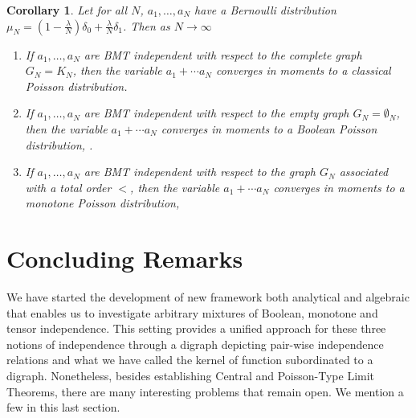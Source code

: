 \documentclass[a4paper,12pt]{extarticle}
\newtheorem{cor}[thm]{Corollary}
\theoremstyle{definition}
\theoremstyle{remark}
\begin{document}
\begin{cor}
	Let for all $N$, $a_1,\ldots, a_N$ have a Bernoulli distribution $\mu_N=(1-\frac{\lambda}{N})\delta_0+\frac{\lambda}{N}\delta_1$.  Then as $N\to \infty$
	
	\begin{enumerate} 
		\item If $a_1,\ldots, a_N$ are BMT independent with respect to the complete graph $G_N=K_N$, 
		then the variable $a_1+\cdots a_N$ converges in moments to a classical Poisson distribution.
		\item 
		If $a_1,\ldots, a_N$ are BMT independent with respect to the empty graph $G_N=\emptyset_N$,  then the variable $a_1+\cdots a_N$ converges in moments to a Boolean Poisson distribution, \cite{BoolWo}.
		\item If $a_1,\ldots, a_N$ are BMT independent with respect to the graph $G_N$ associated with a total order $<$, then the variable $a_1+\cdots a_N$ converges in moments to a monotone Poisson distribution, \cite{Mur2000}
	\end{enumerate}
\end{cor}




\section{Concluding Remarks}

We have started the development of new framework both analytical and algebraic that enables us to investigate arbitrary mixtures of Boolean, monotone and tensor independence. 
%
This setting provides a unified approach for these three notions of independence through a digraph depicting pair-wise independence relations and what we have called the kernel of function subordinated to a digraph. 
%
Nonetheless, besides establishing Central and Poisson-Type Limit Theorems, there are many interesting problems that remain open. 
%
We mention a few in this last section. 
\end{document}
